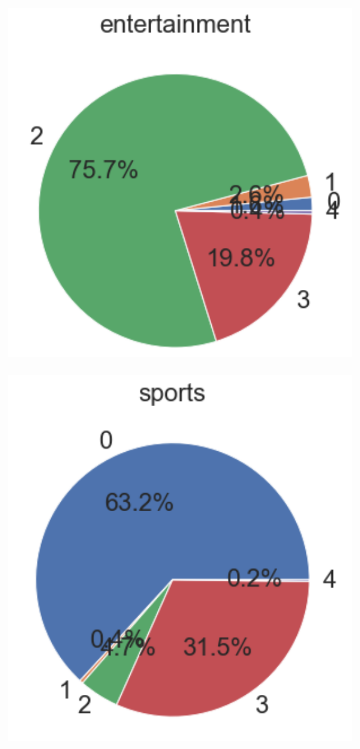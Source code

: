 \begin{figure}[H]
\begin{subfigure}[b]{0.34\textwidth}
         \includegraphics[width=\textwidth]{images/analiza/c_e.png}
     \end{subfigure}
     \hfill
     \begin{subfigure}[b]{0.38\textwidth}
         \centering
         \includegraphics[width=\textwidth]{images/analiza/c_s.png}

\end{subfigure}
\end{figure}
